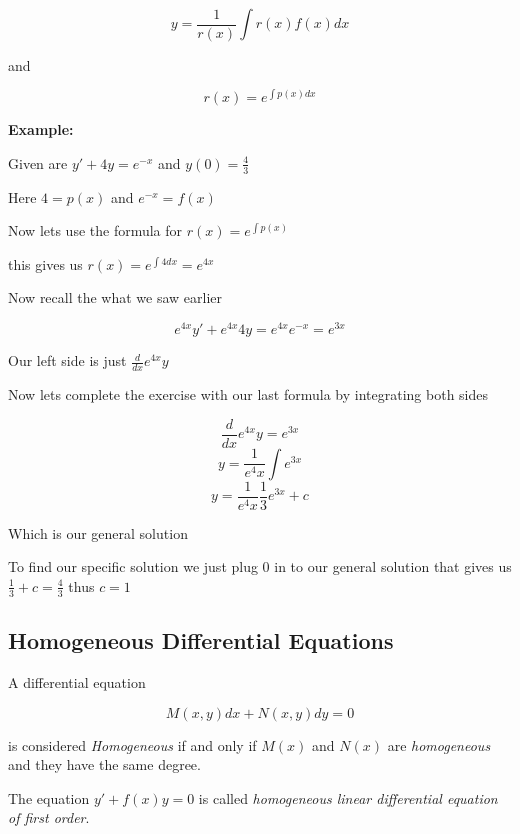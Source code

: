 \[
y = \frac{1}{r (x) } \int r (x) f (x) dx
\]

and 

\[r(x) = e^{\int p (x) dx}\]

\textbf{Example:}
\vspace{\baselineskip}


Given are \(y' + 4y = e^{-x}\) and \(y(0) = \frac{4}{3}\)
\vspace{\baselineskip}

Here \(4 = p(x)\) and \(e^{-x} = f(x)\)
\vspace{\baselineskip}

Now lets use the formula for \(r(x) = e^{\int p (x)}\)
\vspace{\baselineskip}

this gives us \(r(x) = e^{\int 4dx} = e^{4x}\)
\vspace{\baselineskip}

Now recall the what we saw earlier

\[e^{4x}y' + e^{4x}4y = e^{4x}e^{-x} = e^{3x}\]

Our left side is just \(\frac{d}{dx} e^{4x}y\)
\vspace{\baselineskip}

Now lets complete the exercise with our last formula by integrating both sides

\[\frac{d}{dx} e^{4x}y = e^{3x}\]
\[y = \frac{1}{e^4x}\int e^{3x}\]
\[y = \frac{1}{e^4x} \frac{1}{3}e^{3x} + c\]

Which is our general solution
\vspace{\baselineskip}

To find our specific solution we just plug 0 in to our general solution that gives us
\(\frac{1}{3} + c = \frac{4}{3}\) thus \(c = 1\)

\subsection{Homogeneous Differential Equations}

A differential equation 

\[M(x,y)dx + N(x,y)dy = 0\]

is considered \emph{Homogeneous} if and only if
\(M(x)\) and \(N(x)\) are \emph{homogeneous} and they have the same degree.
\vspace{\baselineskip}

The equation \(y' + f(x)y = 0\) is called \emph{homogeneous linear differential equation of first order}.

